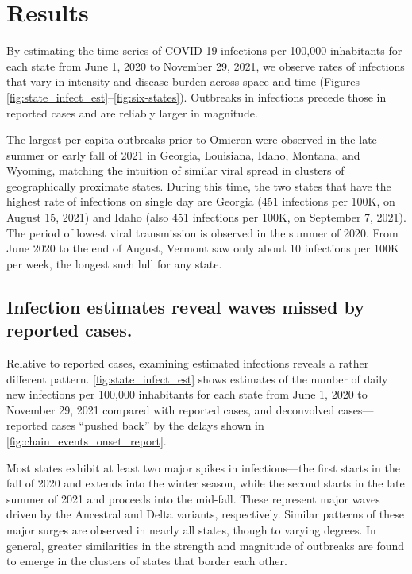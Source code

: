 \section{Results}
\label{sec:results}

By estimating the time series of COVID-19 infections per 100,000 inhabitants
for each \US state from June 1, 2020 to November 29, 2021, we observe rates of
infections that vary in intensity and disease burden across space and time
(Figures \ref{fig:state_infect_est}--\ref{fig:six-states}). Outbreaks in
infections precede those in reported cases and are reliably larger in magnitude.

The largest per-capita outbreaks prior to Omicron were observed in the late
summer or early fall of 2021 in Georgia, Louisiana, Idaho, Montana, and Wyoming,
matching the intuition of similar viral spread in clusters of geographically
proximate states. During this time, the two states that have the highest rate of
infections on single day are Georgia (451 infections per 100K, on August 15,
2021) and Idaho (also 451 infections per 100K, on September 7, 2021). The period
of lowest viral transmission is observed in the summer of 2020. 
From June 2020 to the end of August, Vermont saw only
about 10 infections per 100K per week, the longest such lull for any state.



\subsection{Infection estimates reveal waves missed by reported cases.}
\label{sec:omitted-waves}

Relative to reported cases, examining estimated infections reveals a
rather different pattern. \autoref{fig:state_infect_est} shows
estimates of the number of daily new infections per 100,000 inhabitants for each
\US state from June 1, 2020 to November 29, 2021 compared with reported cases,
and deconvolved cases---reported cases ``pushed back'' by the delays shown in
\autoref{fig:chain_events_onset_report}. 

Most states exhibit at least two major spikes in infections---the first starts
in the fall of 2020 and extends into the winter season, while the second starts
in the late summer of 2021 and proceeds into the mid-fall. These represent major
waves driven by the Ancestral and Delta variants, respectively. Similar patterns
of these major surges are observed in nearly all states, though to varying
degrees. In general, greater similarities in the strength and magnitude of
outbreaks are found to emerge in the clusters of states that border each other.

